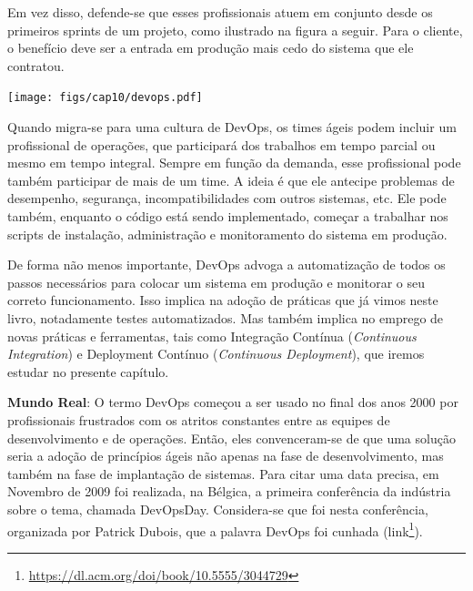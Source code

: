 \documentclass[
  11pt,
  twoside]{book}
\DeclareRobustCommand{\href}[2]{#2\footnote{\url{#1}}}
\newenvironment{esmbox}{\centering \vspace{1.5ex} \begin{tcolorbox}[breakable, colback=backcolor, width=4.9in]}{\end{tcolorbox} \vspace{1.5ex}}
\let\origfigure\figure
\let\endorigfigure\endfigure
\renewenvironment{figure}[1][2] {
    \expandafter\origfigure\expandafter[!h]
} {
    \endorigfigure
}
\begin{document}
Em vez disso, defende-se que esses profissionais atuem em conjunto desde
os primeiros sprints de um projeto, como ilustrado na figura a seguir.
Para o cliente, o benefício deve ser a entrada em produção mais cedo do
sistema que ele contratou.

\begin{figure}
\centering
\texttt{[image: figs/cap10/devops.pdf]}
\caption{Organização baseada em DevOps. Frequentemente, alguns Dev e
alguns Ops sentam juntos para discutir questões sobre a entrega do
sistema.}
\end{figure}

Quando migra-se para uma cultura de DevOps, os times ágeis podem incluir
um profissional de operações, que participará dos trabalhos em tempo
parcial ou mesmo em tempo integral. Sempre em função da demanda, esse
profissional pode também participar de mais de um time. A ideia é que
ele antecipe problemas de desempenho, segurança, incompatibilidades com
outros sistemas, etc. Ele pode também, enquanto o código está sendo
implementado, começar a trabalhar nos scripts de instalação,
administração e monitoramento do sistema em produção.

De forma não menos importante, DevOps advoga a automatização de todos os
passos necessários para colocar um sistema em produção e monitorar o seu
correto funcionamento. Isso implica na adoção de práticas que já vimos
neste livro, notadamente testes automatizados. Mas também implica no
emprego de novas práticas e ferramentas, tais como Integração Contínua
(\emph{Continuous Integration}) e Deployment Contínuo (\emph{Continuous
Deployment}), que iremos estudar no presente capítulo.


\begin{esmbox}

\textbf{Mundo Real}: O termo DevOps começou a ser usado no final dos
anos 2000 por profissionais frustrados com os atritos constantes entre
as equipes de desenvolvimento e de operações. Então, eles convenceram-se
de que uma solução seria a adoção de princípios ágeis não apenas na fase
de desenvolvimento, mas também na fase de implantação de sistemas. Para
citar uma data precisa, em Novembro de 2009 foi realizada, na Bélgica, a
primeira conferência da indústria sobre o tema, chamada DevOpsDay.
Considera-se que foi nesta conferência, organizada por Patrick Dubois,
que a palavra DevOps foi cunhada
(\href{https://dl.acm.org/doi/book/10.5555/3044729}{link}).

\end{esmbox}
\end{document}
